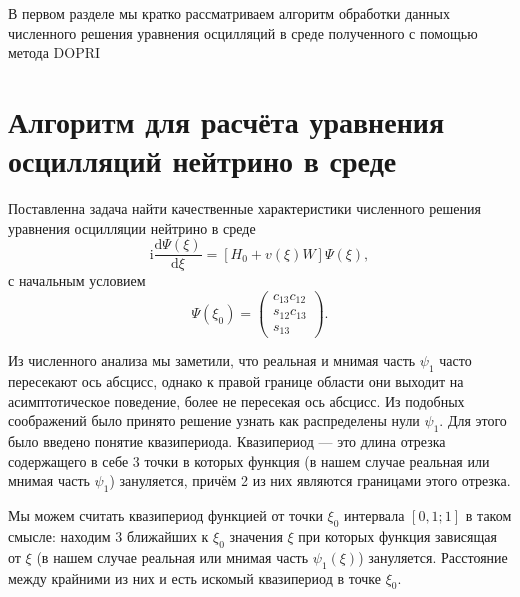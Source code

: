 \documentclass[a4paper,12pt]{article}
\newcommand{\dd}{\mathrm{d}}
\renewcommand{\imath}{\mathrm{i}}
\begin{document}
В первом разделе мы кратко рассматриваем алгоритм обработки данных численного решения уравнения осцилляций в среде полученного с помощью метода DOPRI

	\newpage
	\section{Алгоритм для расчёта уравнения осцилляций нейтрино в среде}
	Поставленна задача найти качественные характеристики численного решения уравнения осцилляции нейтрино в среде
	\begin{equation}\label{eq:15}
		\imath\frac{\dd\Psi(\xi)}{\dd\xi}=[H_{0}+ v(\xi)W]\Psi(\xi),
	\end{equation}
	с начальным условием
	\begin{equation}\label{eq:19}
		\Psi(\xi_0)=
		\begin{pmatrix}
			c_{13}c_{12}\\
			s_{12}c_{13}\\
			s_{13}
		\end{pmatrix}.
	\end{equation}
	
	 Из численного анализа мы заметили, что реальная и мнимая часть \(\psi_1\) часто пересекают ось абсцисс, однако к правой границе области они выходит на асимптотическое поведение, более не пересекая ось абсцисс. Из подобных соображений было принято решение узнать как распределены нули \(\psi_{1}\). Для этого было введено понятие квазипериода. Квазипериод --- это длина отрезка содержащего в себе 3 точки в которых функция  (в нашем случае реальная или мнимая часть \(\psi_1\)) зануляется, причём 2 из них являются границами этого отрезка.

	Мы можем считать квазипериод функцией от точки \(\xi_0\) интервала \([0,1 ; 1]\) в таком смысле: находим 3 ближайших к \(\xi_0\) значения \(\xi\) при которых функция зависящая от \(\xi\) (в нашем случае реальная или мнимая часть \(\psi_1(\xi)\)) зануляется. Расстояние между крайними из них и есть искомый квазипериод в точке \(\xi_0\).
\end{document}

